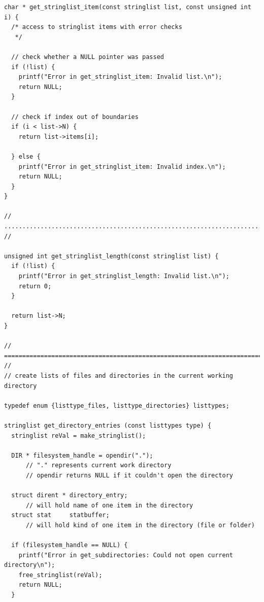 \begin{codebox}[]
\begin{verbatim}
char * get_stringlist_item(const stringlist list, const unsigned int i) {
  /* access to stringlist items with error checks
   */
  
  // check whether a NULL pointer was passed
  if (!list) {
    printf("Error in get_stringlist_item: Invalid list.\n");
    return NULL;
  }
  
  // check if index out of boundaries
  if (i < list->N) {
    return list->items[i];
    
  } else {
    printf("Error in get_stringlist_item: Invalid index.\n");
    return NULL;
  }
}

// ......................................................................... //

unsigned int get_stringlist_length(const stringlist list) {
  if (!list) {
    printf("Error in get_stringlist_length: Invalid list.\n");
    return 0;
  }
  
  return list->N;
}

// ========================================================================= //
// create lists of files and directories in the current working directory

typedef enum {listtype_files, listtype_directories} listtypes;

stringlist get_directory_entries (const listtypes type) {
  stringlist reVal = make_stringlist();
  
  DIR * filesystem_handle = opendir(".");
      // "." represents current work directory
      // opendir returns NULL if it couldn't open the directory 
  
  struct dirent * directory_entry;
      // will hold name of one item in the directory
  struct stat     statbuffer;
      // will hold kind of one item in the directory (file or folder)
  
  if (filesystem_handle == NULL) {
    printf("Error in get_subdirectories: Could not open current directory\n");
    free_stringlist(reVal);
    return NULL;
  }
\end{verbatim}
\end{codebox}

